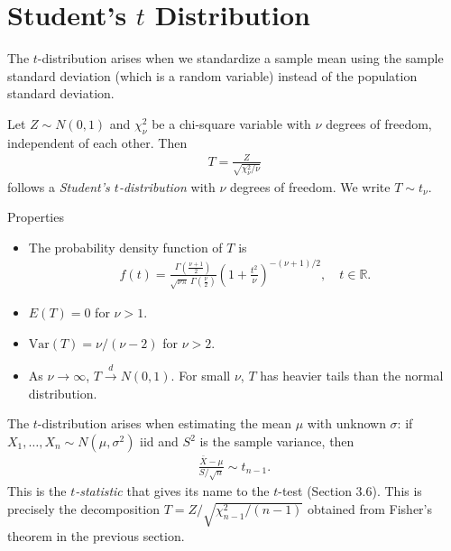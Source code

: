 \section{Student's $t$ Distribution}
\label{sec:distribucion-t}

The $t$-distribution arises when we standardize a sample mean using the sample standard deviation (which is a random variable) instead of the population standard deviation.

\begin{definicion}
Let $Z \sim N(0,1)$ and $\chi^2_\nu$ be a chi-square variable with $\nu$ degrees of freedom, independent of each other. Then
\begin{align}
 \label{eq:3.2.12}
 T = \frac{Z}{\sqrt{\chi^2_\nu / \nu}}
\end{align}
follows a \emph{Student's $t$-distribution} with $\nu$ degrees of freedom. We write $T \sim t_\nu$.
\end{definicion}

{Properties}
\begin{itemize}
 \item The probability density function of $T$ is
 \begin{align}
  \label{eq:3.2.13}
  f(t) = \frac{\Gamma\!\left(\frac{\nu+1}{2}\right)}{\sqrt{\nu\pi}\,\Gamma\!\left(\frac{\nu}{2}\right)}
  \left(1 + \frac{t^2}{\nu}\right)^{-(\nu+1)/2}, \quad t \in \mathbb{R}.
 \end{align}
 \item $E(T) = 0$ for $\nu > 1$.
 \item $\text{Var}(T) = \nu/(\nu - 2)$ for $\nu > 2$.
 \item As $\nu \to \infty$, $T \xrightarrow{d} N(0,1)$. For small $\nu$, $T$ has heavier tails than the normal distribution.
\end{itemize}

\begin{observacion}
The $t$-distribution arises when estimating the mean $\mu$ with unknown $\sigma$: if $X_1, \ldots, X_n \sim N(\mu, \sigma^2)$ iid and $S^2$ is the sample variance, then
\begin{align}
 \label{eq:3.2.14}
 \frac{\bar{X} - \mu}{S/\sqrt{n}} \sim t_{n-1}.
\end{align}
This is the \emph{$t$-statistic} that gives its name to the $t$-test (Section 3.6). This is precisely the decomposition $T = Z/\sqrt{\chi^2_{n-1}/(n-1)}$ obtained from Fisher's theorem in the previous section.
\end{observacion}

